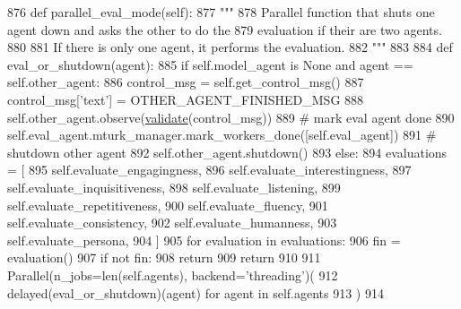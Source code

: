 \begin{DoxyCode}
876     \textcolor{keyword}{def }parallel\_eval\_mode(self):
877         \textcolor{stringliteral}{"""}
878 \textcolor{stringliteral}{        Parallel function that shuts one agent down and asks the other to do the}
879 \textcolor{stringliteral}{        evaluation if their are two agents.}
880 \textcolor{stringliteral}{}
881 \textcolor{stringliteral}{        If there is only one agent, it performs the evaluation.}
882 \textcolor{stringliteral}{        """}
883 
884         \textcolor{keyword}{def }eval\_or\_shutdown(agent):
885             \textcolor{keywordflow}{if} self.model\_agent \textcolor{keywordflow}{is} \textcolor{keywordtype}{None} \textcolor{keywordflow}{and} agent == self.other\_agent:
886                 control\_msg = self.get\_control\_msg()
887                 control\_msg[\textcolor{stringliteral}{'text'}] = OTHER\_AGENT\_FINISHED\_MSG
888                 self.other\_agent.observe(\hyperlink{namespaceparlai_1_1core_1_1worlds_afc3fad603b7bce41dbdc9cdc04a9c794}{validate}(control\_msg))
889                 \textcolor{comment}{# mark eval agent done}
890                 self.eval\_agent.mturk\_manager.mark\_workers\_done([self.eval\_agent])
891                 \textcolor{comment}{# shutdown other agent}
892                 self.other\_agent.shutdown()
893             \textcolor{keywordflow}{else}:
894                 evaluations = [
895                     self.evaluate\_engagingness,
896                     self.evaluate\_interestingness,
897                     self.evaluate\_inquisitiveness,
898                     self.evaluate\_listening,
899                     self.evaluate\_repetitiveness,
900                     self.evaluate\_fluency,
901                     self.evaluate\_consistency,
902                     self.evaluate\_humanness,
903                     self.evaluate\_persona,
904                 ]
905                 \textcolor{keywordflow}{for} evaluation \textcolor{keywordflow}{in} evaluations:
906                     fin = evaluation()
907                     \textcolor{keywordflow}{if} \textcolor{keywordflow}{not} fin:
908                         \textcolor{keywordflow}{return}
909                 \textcolor{keywordflow}{return}
910 
911         Parallel(n\_jobs=len(self.agents), backend=\textcolor{stringliteral}{'threading'})(
912             delayed(eval\_or\_shutdown)(agent) \textcolor{keywordflow}{for} agent \textcolor{keywordflow}{in} self.agents
913         )
914 
\end{DoxyCode}
\mbox{\label{classprojects_1_1controllable__dialogue_1_1mturk_1_1worlds_1_1ControllableDialogEval_a948b46575dd83b3c2496dbf6b8c607d8}} 
